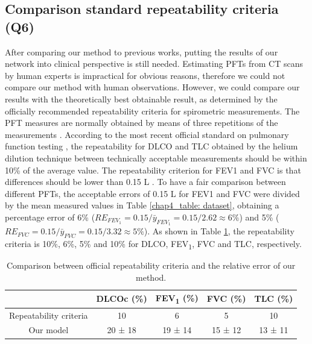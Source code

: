 \subsection{Comparison standard repeatability criteria (Q6)}
After comparing our method to previous works, putting the results of our network into clinical perspective is still needed. Estimating PFTs from CT scans by human experts is impractical for obvious reasons, therefore we could not compare our method with human observations. However, we could compare our results with the theoretically best obtainable result, as determined by the officially recommended repeatability criteria for spirometric measurements. The PFT measures are normally obtained by means of three repetitions of the measurements \cite{Sylvester2020}. According to the most recent official standard on pulmonary function testing \cite{Sylvester2020}, the repeatability for DLCO and TLC obtained by the helium dilution technique between technically acceptable measurements should be within 10\% of the average value. The repeatability criterion for FEV1 and FVC is that differences should be lower than 0.15 L \cite{Sylvester2020}. To have a fair comparison between different PFTs, the acceptable errors of 0.15 L for FEV1 and FVC were divided by the mean measured values in Table \ref{chap4_table: dataset}, obtaining a percentage error of 6\% ($RE_{FEV_1} = 0.15/\bar{y}_{FEV_1} = 0.15/2.62 \approx 6\%$) and 5\% ($RE_{FVC} = 0.15/\bar{y}_{FVC} = 0.15/3.32 \approx 5\%$). As shown in Table \ref{chap4_table_compare_repeatibility}, the repeatability criteria is 10\%, 6\%, 5\% and 10\% for DLCO, FEV\textsubscript{1}, FVC and TLC, respectively. 

\begin{table}[h]
\centering
\caption{Comparison between official repeatability criteria and the relative error of our method.}
\begin{tabular}{c|c|c|c|c}
\hline
                                & DLCOc (\%) & FEV\textsubscript{1} (\%) & FVC (\%) & TLC (\%) \\ \hline
Repeatability criteria & 10         & 6         & 5        & 10       \\
Our model          & 20 ± 18    & 19 ± 14   & 15 ± 12  & 13 ± 11  \\
 \hline
\end{tabular}
\label{chap4_table_compare_repeatibility}
\end{table}




